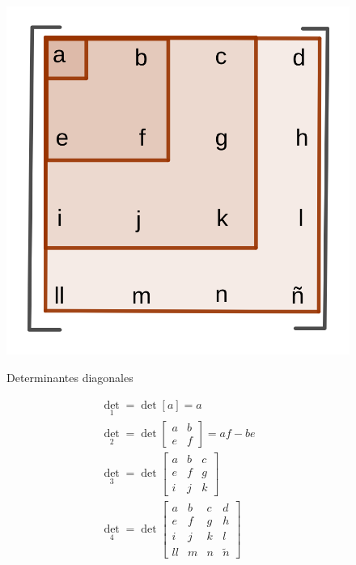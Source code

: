 \documentclass{article}
\begin{document}
\begin{figure}[ht]
\caption{Determinantes diagonales}
\includegraphics[scale=0.8]{img/extremos/determinante_diagonal.png} 
\centering
\label{fig:detdiag}
\end{figure}

\begin{subequations}
\begin{gather}
\det_1 = \det [a] = a \\
\det_2 = \det \begin{bmatrix} a & b \\ e & f \end{bmatrix} = a f - b e \\
\det_3 = \det \begin{bmatrix} a & b & c \\ e & f & g \\ i & j & k \end{bmatrix} \\
\det_4 = \det \begin{bmatrix} a & b & c & d \\ e & f & g & h \\ i & j & k & l \\ ll & m & n & \tilde{n} \end{bmatrix}
\end{gather}
\end{subequations}
\end{document}
